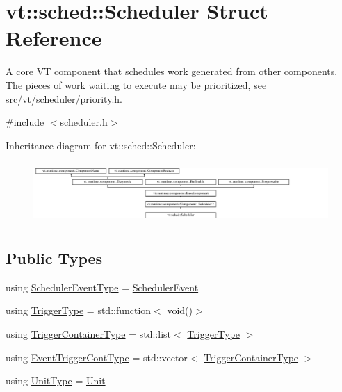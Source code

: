 \hypertarget{structvt_1_1sched_1_1_scheduler}{}\section{vt\+:\+:sched\+:\+:Scheduler Struct Reference}
\label{structvt_1_1sched_1_1_scheduler}


A core VT component that schedules work generated from other components. The pieces of work waiting to execute may be prioritized, see \hyperlink{priority_8h}{src/vt/scheduler/priority.\+h}.  




{\ttfamily \#include $<$scheduler.\+h$>$}

Inheritance diagram for vt\+:\+:sched\+:\+:Scheduler\+:\begin{figure}[H]
\begin{center}
\leavevmode
\includegraphics[height=2.372881cm]{structvt_1_1sched_1_1_scheduler}
\end{center}
\end{figure}
\subsection*{Public Types}
\begin{DoxyCompactItemize}
\item 
using \hyperlink{structvt_1_1sched_1_1_scheduler_ad40b8136b7810da5bab9b27e317e4eb3}{Scheduler\+Event\+Type} = \hyperlink{namespacevt_1_1sched_a54756ec39b60951d6765fcfa692d1616}{Scheduler\+Event}
\item 
using \hyperlink{structvt_1_1sched_1_1_scheduler_aa0c06d6e1c31a5f1c3db474036ad7d29}{Trigger\+Type} = std\+::function$<$ void()$>$
\item 
using \hyperlink{structvt_1_1sched_1_1_scheduler_a0b9fe2a5ee31ca84fa52764a126ad666}{Trigger\+Container\+Type} = std\+::list$<$ \hyperlink{structvt_1_1sched_1_1_scheduler_aa0c06d6e1c31a5f1c3db474036ad7d29}{Trigger\+Type} $>$
\item 
using \hyperlink{structvt_1_1sched_1_1_scheduler_a68203230dc48285d3d50bbb363ed267b}{Event\+Trigger\+Cont\+Type} = std\+::vector$<$ \hyperlink{structvt_1_1sched_1_1_scheduler_a0b9fe2a5ee31ca84fa52764a126ad666}{Trigger\+Container\+Type} $>$
\item 
using \hyperlink{structvt_1_1sched_1_1_scheduler_a398229f29b0940cea85aba4bae78b0be}{Unit\+Type} = \hyperlink{structvt_1_1sched_1_1_unit}{Unit}
\end{DoxyCompactItemize}
